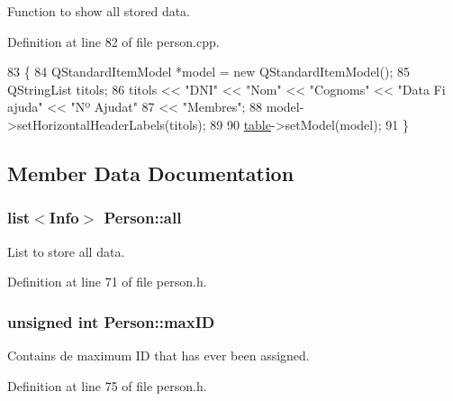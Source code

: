 Function to show all stored data. 



Definition at line 82 of file person.\+cpp.


\begin{DoxyCode}
83 \{
84     QStandardItemModel *model = \textcolor{keyword}{new} QStandardItemModel();
85     QStringList titols;
86     titols << \textcolor{stringliteral}{"DNI"} << \textcolor{stringliteral}{"Nom"} << \textcolor{stringliteral}{"Cognoms"} << \textcolor{stringliteral}{"Data Fi ajuda"} << \textcolor{stringliteral}{"Nº Ajudat"}
87            << \textcolor{stringliteral}{"Membres"};
88     model->setHorizontalHeaderLabels(titols);
89     
90     \hyperlink{class_person_aefba04c96d0d90ab2b220e6ad704c55a}{table}->setModel(model);
91 \}
\end{DoxyCode}


\subsection{Member Data Documentation}
\hypertarget{class_person_a19f67351290e2dd1b63a43d4622a46a9}{
\subsubsection[{all}]{\setlength{\rightskip}{0pt plus 5cm}list$<${\bf Info}$>$ Person\+::all\hspace{0.3cm}{\ttfamily [private]}}}\label{class_person_a19f67351290e2dd1b63a43d4622a46a9}


List to store all data. 



Definition at line 71 of file person.\+h.

\hypertarget{class_person_a816ee6194426eb703b61ae267e8e8ee6}{
\subsubsection[{max\+I\+D}]{\setlength{\rightskip}{0pt plus 5cm}unsigned int Person\+::max\+I\+D\hspace{0.3cm}{\ttfamily [private]}}}\label{class_person_a816ee6194426eb703b61ae267e8e8ee6}


Contains de maximum I\+D that has ever been assigned. 



Definition at line 75 of file person.\+h.

